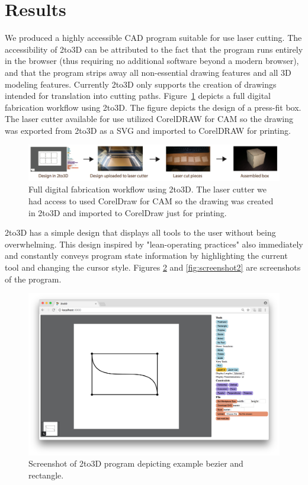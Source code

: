 \section{Results}

We produced a highly accessible CAD program suitable for use laser cutting. The accessibility of 2to3D can be attributed to the fact that the program runs entirely in the browser (thus requiring no additional software beyond a modern browser), and that the program strips away all non-essential drawing features and all 3D modeling features. Currently 2to3D only supports the creation of drawings intended for translation into cutting paths. Figure~\ref{fig:usingProgram} depicts a full digital fabrication workflow using 2to3D. The figure depicts the design of a press-fit box. The laser cutter available for use utilized CorelDRAW for CAM so the drawing was exported from 2to3D as a SVG and imported to CorelDRAW for printing.

\begin{figure}[H]
  \includegraphics[width=\linewidth]{usingProgram.jpg}
  \caption{Full digital fabrication workflow using 2to3D. The laser cutter we had access to used CorelDraw for CAM so the drawing was created in 2to3D and imported to CorelDraw just for printing.}
  \label{fig:usingProgram}
\end{figure}

2to3D has a simple design that displays all tools to the user without being overwhelming. This design inspired by "lean-operating practices" also immediately and constantly conveys program state information by highlighting the current tool and changing the cursor style. Figures \ref{fig:screenshot} and \ref{fig:screenshot2} are screenshots of the program.

\begin{figure}[H]
  \includegraphics[width=\linewidth]{screenshot.png}
  \caption{Screenshot of 2to3D program depicting example bezier and rectangle.}
  \label{fig:screenshot}
\end{figure}

